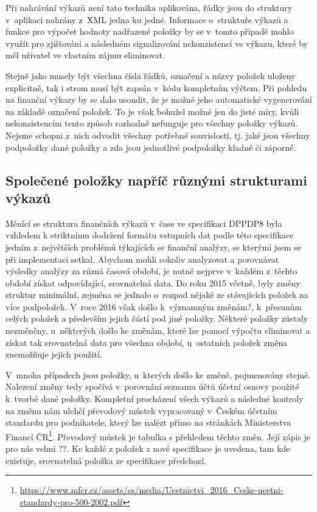 Při nahrávání výkazů není tato technika aplikována, řádky jsou do struktury v~aplikaci nahrány z~XML jedna ku jedné. Informace o~struktuře výkazů a funkce pro výpočet hodnoty nadřazené položky by se v~tomto případě mohlo využít pro zjišťování a následném signalizování nekonzistencí ve výkazu, které by měl uživatel ve vlastním zájmu eliminovat.

Stejně jako musely být všechna čísla řádků, označení a názvy položek uloženy explicitně, tak i strom musí být zapsán v~kódu kompletním výčtem. Při pohledu na finanční výkazy by se dalo usoudit, že je možné jeho automatické vygenerování na základě označení položek. To je však bohužel možné jen do jisté míry, kvůli nekonzistencím tento způsob rozhodně nefunguje pro všechny položky výkazů. Nejsme schopni z~nich odvodit všechny potřebné souvislosti, tj. jaké jsou všechny podpoložky dané položky a zda jsou jednotlivé podpoložky kladné či záporné.


\subsection{Společené položky napříč různými strukturami výkazů}
\label{spol}
Měnící se struktura finančních výkazů v~čase ve specifikaci DPPDP8 byla vzhledem k striktnímu dodržení formátu vstupních dat podle této specifikace jedním z~největších problémů týkajících se finanční analýzy, se kterými jsem se při implementaci setkal. Abychom mohli cokoliv analyzovat a porovnávat výsledky analýzy za různá časová období, je nutné nejprve v~každém z~těchto období získat odpovídající, srovnatelná data. Do roku 2015 včetně, byly změny struktur minimální, zejména se jednalo o~rozpad nějaké ze stávajících položek na více podpoložek. V~roce 2016 však došlo k~významným změnám?, k~přesunům celých položek a především jejich částí pod jiné položky. Některé položky zůstaly nezměněny, u~některých došlo ke změnám, které lze pomocí výpočtu eliminovat a získat tak srovnatelná data pro všechna období, u~ostatních položek změna znemožňuje jejich použití. 


V~mnoha případech jsou položky, u~kterých došlo ke změně, pojmenovány stejně. Nalezení změny tedy spočívá v~porovnání seznamu účtů účetní osnovy použité k~tvorbě dané položky. Kompletní procházení všech výkazů a následné kontroly na změnu nám ulehčí převodový můstek vypracovaný v~Českém účetním standardu pro podnikatele, který lze nalézt přímo na stránkách Ministerstva Financí ČR\footnote{\url{https://www.mfcr.cz/assets/cs/media/Ucetnictvi\_2016\_Ceske-ucetni-standardy-pro-500-2002.pdf}}. Převodový můstek je tabulka s přehledem těchto změn. Její zápis je pro nás velmi ??. Ke každé z položek z nové specifikace je uvedena, tam kde existuje, srovnatelná položka ze specifikace předchozí.

